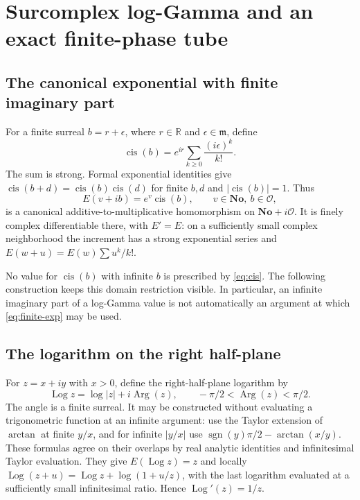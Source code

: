 \documentclass[11pt,letterpaper]{article}
\numberwithin{equation}{section}
\theoremstyle{plain}
\theoremstyle{definition}
\theoremstyle{remark}
\newcommand{\No}{\mathbf{No}}
\newcommand{\R}{\mathbb R}
\newcommand{\Ocal}{\mathcal O}
\newcommand{\mi}{\mathfrak m}
\newcommand{\sgn}{\operatorname{sgn}}
\newcommand{\cis}{\operatorname{cis}}
\newcommand{\Log}{\operatorname{Log}}
\newcommand{\abs}[1]{\lvert#1\rvert}
\begin{document}
\section{Surcomplex log-Gamma and an exact finite-phase tube}
\label{sec:surcomplex}

\subsection{The canonical exponential with finite imaginary part}
For a finite surreal $b=r+\epsilon$, where $r\in\R$ and
$\epsilon\in\mi$, define
\begin{equation}\label{eq:cis}
 \cis(b)=e^{ir}\sum_{k\ge0}\frac{(i\epsilon)^k}{k!}.
\end{equation}
The sum is strong. Formal exponential identities give
$\cis(b+d)=\cis(b)\cis(d)$ for finite $b,d$ and
$\abs{\cis(b)}=1$. Thus
\begin{equation}\label{eq:finite-exp}
 E(v+ib)=e^v\cis(b),\qquad v\in\No,\ b\in\Ocal,
\end{equation}
is a canonical additive-to-multiplicative homomorphism on
$\No+i\Ocal$. It is finely complex differentiable there, with $E'=E$:
on a sufficiently small complex neighborhood the increment has a strong
exponential series and $E(w+u)=E(w)\sum u^k/k!$.

No value for $\cis(b)$ with infinite $b$ is prescribed by
\eqref{eq:cis}. The following construction keeps this domain restriction
visible. In particular, an infinite imaginary part of a log-Gamma value is
not automatically an argument at which \eqref{eq:finite-exp} may be used.

\subsection{The logarithm on the right half-plane}
For $z=x+iy$ with $x>0$, define the right-half-plane logarithm by
\[
 \Log z=\log\abs z+i\operatorname{Arg}(z),\qquad
 -\pi/2<\operatorname{Arg}(z)<\pi/2.
\]
The angle is a finite surreal. It may be constructed without evaluating a
trigonometric function at an infinite argument: use the Taylor extension of
$\arctan$ at finite $y/x$, and for infinite $\abs{y/x}$ use
$\sgn(y)\pi/2-\arctan(x/y)$. These formulas agree on their overlaps by
real analytic identities and infinitesimal Taylor evaluation. They give
$E(\Log z)=z$ and locally $\Log(z+u)=\Log z+\log(1+u/z)$, with the
last logarithm evaluated at a sufficiently small infinitesimal ratio.
Hence $\Log'(z)=1/z$.
\end{document}
